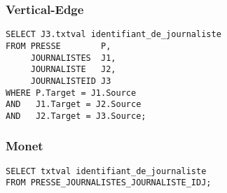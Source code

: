 \subsubsection{Vertical-Edge}
\begin{verbatim}
SELECT J3.txtval identifiant_de_journaliste
FROM PRESSE        P,
     JOURNALISTES  J1,
     JOURNALISTE   J2,
     JOURNALISTEID J3
WHERE P.Target = J1.Source
AND   J1.Target = J2.Source
AND   J2.Target = J3.Source;
\end{verbatim}

\subsubsection{Monet}
\begin{verbatim}
SELECT txtval identifiant_de_journaliste
FROM PRESSE_JOURNALISTES_JOURNALISTE_IDJ;
\end{verbatim}

